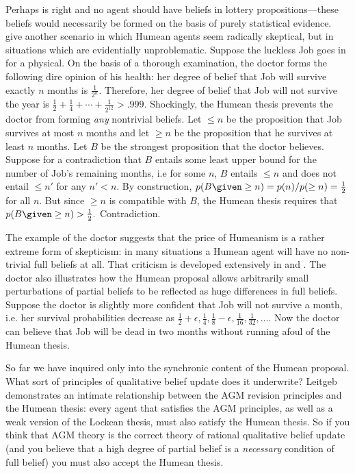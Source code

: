 Perhaps \citet{buchak2014belief} is right and no agent should have beliefs in
lottery propositions---these beliefs would necessarily be formed on the basis of
purely statistical evidence. \citet{lin2019correspondence} give another scenario
in which Humean agents seem radically skeptical, but in situations which are
evidentially unproblematic. Suppose the luckless Job goes in for a physical. On
the basis of a thorough examination, the doctor forms the following dire opinion
of his health: her degree of belief that Job will survive exactly $n$ months is
$\frac{1}{2^n}.$ Therefore, her degree of belief that Job will not survive the
year is $\frac{1}{2} + \frac{1}{4} + \cdots + \frac{1}{2^{12}} > .999.$
Shockingly, the Humean thesis prevents the doctor from forming {\em any}
nontrivial beliefs. Let $\leq n$ be the proposition that Job survives at most
$n$ months and let $\geq n$ be the proposition that he survives at least $n$
months. Let $B$ be the strongest proposition that the doctor believes. Suppose
for a contradiction that $B$ entails some least upper bound for the number of
Job's remaining months, i.e for some $n$, $B$ entails $\leq n$ and does not
entail $\leq n'$ for any $n'<n$.  By construction, $p(B \given \geq n) =
p(n)/p(\geq n) = \frac{1}{2}$ for all $n$. But since $\geq n$ is compatible with
$B$, the Humean thesis requires that $p(B \given  \geq n) > \frac{1}{2}.$
Contradiction. 

The example of the doctor suggests that the price of Humeanism is a rather
extreme form of skepticism: in many situations a Humean agent will have no
non-trivial full beliefs at all. That criticism is developed extensively in
\citet{rott2017stability} and \citet{douven2018probabilities}. The doctor also
illustrates how the Humean proposal allows arbitrarily small perturbations of
partial beliefs to be reflected as huge differences in full beliefs. Suppose the
doctor is slightly more confident that Job will not survive a month, i.e. her
survival probabilities decrease as $\frac{1}{2} + \epsilon, \frac{1}{4},
\frac{1}{8} - \epsilon, \frac{1}{16}, \frac{1}{32}, \ldots.$ Now the doctor can
believe that Job will be dead in two months without running afoul of the Humean
thesis.

So far we have inquired  only into the synchronic content of the Humean
proposal. What sort of principles of qualitative belief update does it underwrite?
Leitgeb demonstrates an intimate relationship between the AGM revision principles
and the Humean thesis: every agent that satisfies the AGM principles, as well as
a weak version of the Lockean thesis, must also satisfy the Humean thesis. So if
you think that AGM theory is the correct theory of rational qualitative belief
update (and you believe that a high degree of partial belief is a {\em
necessary} condition of full belief) you must also accept the Humean thesis.


